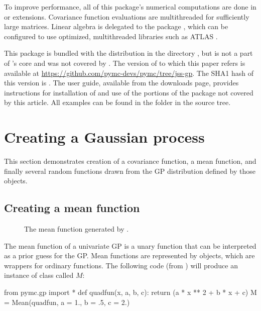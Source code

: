 \documentclass[article]{jss}
\begin{document}
To improve performance, all of this package's numerical computations are done in  or  extensions. Covariance function evaluations are multithreaded for sufficiently large matrices. Linear algebra is delegated to the  package \citep{numpybook}, which can be configured to use optimized, multithreaded libraries such as ATLAS \citep{atlas}. 

\medskip
This package is bundled with the  distribution in the directory , but is not a part of 's core and was not covered by \cite{pymc}. The version of  to which this paper refers is available at \href{https://github.com/pymc-devs/pymc/tree/jss-gp}{https://github.com/pymc-devs/pymc/tree/jss-gp}. The SHA1 hash of this version is . The  user guide, available from the downloads page, provides instructions for installation of  and use of the portions of the package not covered by this article. All examples can be found in the folder  in the source tree. 

\section{Creating a Gaussian process}\label{sub:inst}


This section demonstrates creation of a covariance function, a mean function, and finally several random functions drawn from the GP distribution defined by those objects.

\subsection{Creating a mean function}\label{subsub:mean}

\begin{figure}
    \centering
    \caption{The mean function generated by .}
    \label{fig:mean}
\end{figure}

The mean function of a univariate GP is a unary function that can be interpreted as a prior guess for the GP. Mean functions are represented by  objects, which are wrappers for ordinary  functions. The following code (from ) will produce an instance of class  called $M$:
\begin{CodeChunk}
\begin{CodeInput}
from pymc.gp import *
def quadfun(x, a, b, c):
    return (a * x ** 2 + b * x + c)
M = Mean(quadfun, a = 1., b = .5, c = 2.)        
\end{CodeInput}
\end{CodeChunk}
\end{document}
